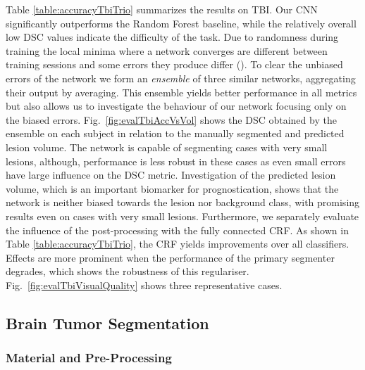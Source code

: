 Table \ref{table:accuracyTbiTrio} summarizes the results on TBI. Our CNN significantly outperforms the Random Forest baseline, while the relatively overall low DSC values indicate the difficulty of the task.  Due to randomness during training the local minima where a network converges are different between training sessions and some errors they produce differ (\cite{Choromanska2015}). To clear the unbiased errors of the network we form an \textit{ensemble} of three similar networks, aggregating their output by averaging. This ensemble yields better performance in all metrics but also allows us to investigate the behaviour of our network focusing only on the biased errors. Fig.~\ref{fig:evalTbiAccVsVol} shows the DSC obtained by the ensemble on each subject in relation to the manually segmented and predicted lesion volume. The network is capable of segmenting cases with very small lesions, although, performance is less robust in these cases as even small errors have large influence on the DSC metric. Investigation of the predicted lesion volume, which is an important biomarker for prognostication, shows that the network is neither biased towards the lesion nor background class, with promising results even on cases with very small lesions. Furthermore, we separately evaluate the influence of the post-processing with the fully connected CRF. As shown in Table \ref{table:accuracyTbiTrio}, the CRF yields improvements over all classifiers. Effects are more prominent when the performance of the primary segmenter degrades, which shows the robustness of this regulariser. Fig.~\ref{fig:evalTbiVisualQuality} shows three representative cases.






\subsection{Brain Tumor Segmentation}
\label{subsec:evalBrats}

\subsubsection{Material and Pre-Processing}

